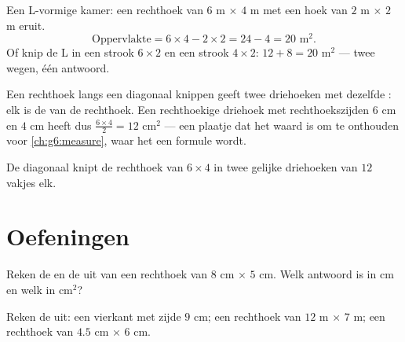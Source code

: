 \begin{example}\label{ex:g5:areas:composite}
Een L-vormige kamer: een rechthoek van $6$ m $\times$ $4$ m met een hoek van
$2$ m $\times$ $2$ m eruit.
\[
\text{Oppervlakte} = 6 \times 4 - 2 \times 2 = 24 - 4 = 20 \text{ m}^2 .
\]
Of knip de L in een strook $6 \times 2$ en een strook $4 \times 2$:
$12 + 8 = 20$ m$^2$ --- twee wegen, één antwoord.
\end{example}

\begin{example}\label{ex:g5:areas:halfrect}
Een rechthoek langs een diagonaal knippen geeft twee driehoeken met dezelfde
: elk is de \emph{} van de rechthoek. Een rechthoekige
driehoek met rechthoekszijden $6$ cm en $4$ cm heeft dus 
$\frac{6 \times 4}{2} = 12$ cm$^2$ --- een plaatje dat het waard is om te
onthouden voor \cref{ch:g6:measure}, waar het een formule wordt.
\end{example}

\begin{omfigure}

{\small De diagonaal knipt de rechthoek van $6 \times 4$ in twee gelijke
driehoeken van $12$ vakjes elk.}
\end{omfigure}

\section{Oefeningen}

\begin{exercise}[$\star$]\label{exo:g5:areas:1}
Reken de  en de  uit van een rechthoek van $8$ cm $\times$
$5$ cm. Welk antwoord is in cm en welk in cm$^2$?
\end{exercise}

\begin{exercise}[$\star$]\label{exo:g5:areas:2}
Reken de  uit: een vierkant met zijde $9$ cm; een rechthoek van
$12$ m $\times$ $7$ m; een rechthoek van $4.5$ cm $\times$ $6$ cm.
\end{exercise}

